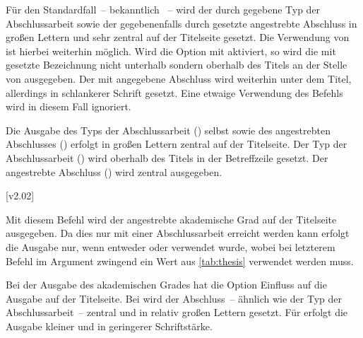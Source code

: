 \begin{DeclareEntity*}{}
\begin{DeclareEntity*}{}
\begin{DeclareEntity*}{}
\begin{Declaration}
Für den Standardfall~-- bekanntlich ~-- wird der 
durch  gegebene Typ der Abschlussarbeit sowie der gegebenenfalls 
durch  gesetzte angestrebte Abschluss in großen Lettern und 
sehr zentral auf der Titelseite gesetzt. Die Verwendung von  ist 
hierbei weiterhin möglich.
%
Wird die Option mit  aktiviert, so wird die mit 
 gesetzte Bezeichnung nicht unterhalb sondern oberhalb des Titels 
an der Stelle von  ausgegeben. Der mit  
angegebene Abschluss wird weiterhin unter dem Titel, allerdings in schlankerer 
Schrift gesetzt. Eine etwaige Verwendung des Befehls  wird in 
diesem Fall ignoriert.
%
\begin{DeclareValues}{}
  Die Ausgabe des Typs der Abschlussarbeit () selbst sowie des 
  angestrebten Abschlusses () erfolgt in großen Lettern 
  zentral auf der Titelseite.
  Der Typ der Abschlussarbeit () wird oberhalb des Titels in der 
  Betreffzeile gesetzt. Der angestrebte Abschluss () wird 
  zentral ausgegeben.
\end{DeclareValues}
\end{Declaration}

\begin{Declaration}
  {}
  [v2.02]
\printdeclarationlist

Mit diesem Befehl wird der angestrebte akademische Grad auf der Titelseite 
ausgegeben. Da dies nur mit einer Abschlussarbeit erreicht werden kann erfolgt 
die Ausgabe nur, wenn entweder  oder  verwendet 
wurde, wobei bei letzterem Befehl im Argument zwingend ein Wert aus 
\autoref{tab:thesis} verwendet werden muss.

Bei der Ausgabe des akademischen Grades hat die Option  
Einfluss auf die Ausgabe auf der Titelseite. Bei  
wird der Abschluss~-- ähnlich wie der Typ der Abschlussarbeit~-- zentral und in 
relativ großen Lettern gesetzt. Für  erfolgt die 
Ausgabe kleiner und in geringerer Schriftstärke.
\end{Declaration}

\begin{Declaration}
  {}
\begin{Declaration}
  {}
\begin{Declaration}
  {}
\begin{Declaration}
  {}


\end{Declaration}
\end{Declaration}
\end{Declaration}
\end{Declaration}
\end{DeclareEntity*}
\end{DeclareEntity*}
\end{DeclareEntity*}
